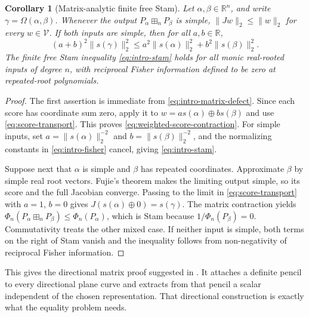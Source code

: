 \documentclass[12pt,reqno]{amsart}
\newtheorem{corollary}[corollary]{Corollary}
\theoremstyle{definition}
\theoremstyle{remark}
\newcommand{\R}{\mathbb R}
\begin{document}
\begin{corollary}[Matrix-analytic finite free Stam]
\label{cor:matrix-stam}
Let \(\alpha,\beta\in\R^n\), and write \(\gamma=\Omega(\alpha,\beta)\).
Whenever the output \(P_\alpha\boxplus_nP_\beta\) is simple,
\(\lVert Jw\rVert_2\leq\lVert w\rVert_2\) for every
\(w\in\mathcal V\).  If both inputs are simple, then for all
\(a,b\in\R\),
\begin{equation}\label{eq:weighted-score-contraction}
 (a+b)^2\lVert s(\gamma)\rVert_2^2
 \leq a^2\lVert s(\alpha)\rVert_2^2
 +b^2\lVert s(\beta)\rVert_2^2.
\end{equation}
The finite free Stam inequality \eqref{eq:intro-stam} holds for all
monic real-rooted inputs of degree \(n\), with reciprocal Fisher
information defined to be zero at repeated-root polynomials.
\end{corollary}

\begin{proof}
The first assertion is immediate from
\eqref{eq:intro-matrix-defect}.  Since each score has coordinate sum zero,
apply it to \(w=a s(\alpha)\oplus b s(\beta)\) and use
\eqref{eq:score-transport}.  This proves
\eqref{eq:weighted-score-contraction}.  For simple inputs, set \(a=\lVert s(\alpha)\rVert_2^{-2}\) and \(b=\lVert s(\beta)\rVert_2^{-2}\), and the normalizing constants in
\eqref{eq:intro-fisher} cancel, giving \eqref{eq:intro-stam}.

Suppose next that \(\alpha\) is simple and \(\beta\) has repeated
coordinates.  Approximate \(\beta\) by simple real root vectors.
Fujie's theorem makes the limiting output simple, so its score and
the full Jacobian converge.  Passing to the limit in
\eqref{eq:score-transport} with \(a=1\), \(b=0\) gives
\(J(s(\alpha)\oplus0)=s(\gamma)\).  The matrix contraction yields
\(\Phi_n(P_\alpha\boxplus_nP_\beta)\leq\Phi_n(P_\alpha)\),
which is Stam because \(1/\Phi_n(P_\beta)=0\).
Commutativity treats the other mixed case.  If neither input is simple,
both terms on the right of Stam vanish and the inequality follows
from non-negativity of reciprocal Fisher information.
\end{proof}

This gives the directional matrix proof suggested in
\cite[\S5, footnote~2]{GVS26}.  It attaches a definite pencil to every
directional plane curve and extracts from that pencil a scalar independent of the chosen representation.  That directional construction is exactly what the equality problem needs.
\end{document}
